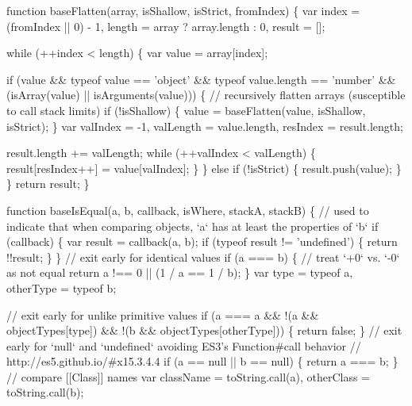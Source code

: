 \begin{DoxyCodeInclude}
    \textcolor{keyword}{function} baseFlatten(array, isShallow, isStrict, fromIndex) \{
      var index = (fromIndex || 0) - 1,
          length = array ? array.length : 0,
          result = [];

      while (++index < length) \{
        var value = array[index];

        \textcolor{keywordflow}{if} (value && typeof value == \textcolor{stringliteral}{'object'} && typeof value.length == \textcolor{stringliteral}{'number'}
            && (isArray(value) || isArguments(value))) \{
          \textcolor{comment}{// recursively flatten arrays (susceptible to call stack limits)}
          \textcolor{keywordflow}{if} (!isShallow) \{
            value = baseFlatten(value, isShallow, isStrict);
          \}
          var valIndex = -1,
              valLength = value.length,
              resIndex = result.length;

          result.length += valLength;
          \textcolor{keywordflow}{while} (++valIndex < valLength) \{
            result[resIndex++] = value[valIndex];
          \}
        \} \textcolor{keywordflow}{else} \textcolor{keywordflow}{if} (!isStrict) \{
          result.push(value);
        \}
      \}
      \textcolor{keywordflow}{return} result;
    \}

    \textcolor{keyword}{function} baseIsEqual(a, b, callback, isWhere, stackA, stackB) \{
      \textcolor{comment}{// used to indicate that when comparing objects, `a` has at least the properties of `b`}
      \textcolor{keywordflow}{if} (callback) \{
        var result = callback(a, b);
        \textcolor{keywordflow}{if} (typeof result != \textcolor{stringliteral}{'undefined'}) \{
          \textcolor{keywordflow}{return} !!result;
        \}
      \}
      \textcolor{comment}{// exit early for identical values}
      \textcolor{keywordflow}{if} (a === b) \{
        \textcolor{comment}{// treat `+0` vs. `-0` as not equal}
        \textcolor{keywordflow}{return} a !== 0 || (1 / a == 1 / b);
      \}
      var type = typeof a,
          otherType = typeof b;

      \textcolor{comment}{// exit early for unlike primitive values}
      \textcolor{keywordflow}{if} (a === a &&
          !(a && objectTypes[type]) &&
          !(b && objectTypes[otherType])) \{
        \textcolor{keywordflow}{return} \textcolor{keyword}{false};
      \}
      \textcolor{comment}{// exit early for `null` and `undefined` avoiding ES3's Function#call behavior}
      \textcolor{comment}{// http://es5.github.io/#x15.3.4.4}
      \textcolor{keywordflow}{if} (a == null || b == null) \{
        \textcolor{keywordflow}{return} a === b;
      \}
      \textcolor{comment}{// compare [[Class]] names}
      var className = toString.call(a),
          otherClass = toString.call(b);


\end{DoxyCodeInclude}
